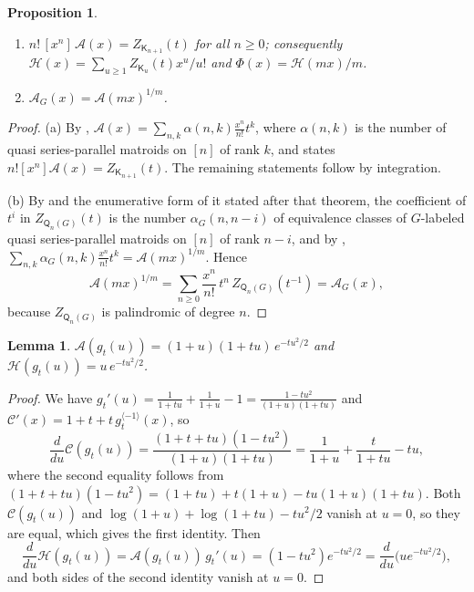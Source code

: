 \documentclass[11pt]{amsart}
\newtheorem{proposition}[theorem]{Proposition}
\newtheorem{lemma}[theorem]{Lemma}
\theoremstyle{definition}
\theoremstyle{remark}
\numberwithin{equation}{section}
\newcommand{\Q}{\mathsf{Q}}
\newcommand{\K}{\mathsf{K}}
\begin{document}
\begin{proposition}\label{prop:FL}
\begin{enumerate}[label=\textup{(\alph*)}]
\item $n!\,[x^n]\,\mathcal{A}(x)=Z_{\K_{n+1}}(t)$ for all $n\ge0$; consequently $\mathcal{H}(x)=\sum_{u\ge1}Z_{\K_u}(t)x^u/u!$ and $\Phi(x)=\mathcal{H}(mx)/m$.
\item $\mathcal{A}_G(x)=\mathcal{A}(mx)^{1/m}$.
\end{enumerate}
\end{proposition}

\begin{proof}
(a) By \cite[Propositions~2.3 and~2.8]{FL24}, $\mathcal{A}(x)=\sum_{n,k}\alpha(n,k)\frac{x^n}{n!}t^k$, where $\alpha(n,k)$ is the number of quasi series-parallel matroids on $[n]$ of rank $k$, and \cite[Corollary~3.2]{FL24} states $n![x^n]\mathcal{A}(x)=Z_{\K_{n+1}}(t)$. The remaining statements follow by integration.

(b) By \cite[Theorem~1.1]{FL26} and the enumerative form of it stated after that theorem, the coefficient of $t^i$ in $Z_{\Q_n(G)}(t)$ is the number $\alpha_G(n,n-i)$ of equivalence classes of $G$-labeled quasi series-parallel matroids on $[n]$ of rank $n-i$, and by \cite[Proposition~3.2]{FL26}, $\sum_{n,k}\alpha_G(n,k)\frac{x^n}{n!}t^k=\mathcal{A}(mx)^{1/m}$. Hence
\[
\mathcal{A}(mx)^{1/m}=\sum_{n\ge0}\frac{x^n}{n!}\,t^n\,Z_{\Q_n(G)}(t^{-1})=\mathcal{A}_G(x),
\]
because $Z_{\Q_n(G)}$ is palindromic of degree $n$.
\end{proof}

\begin{lemma}\label{lem:uncompose}
$\mathcal{A}(g_t(u))=(1+u)(1+tu)\,e^{-tu^2/2}$ and $\mathcal{H}(g_t(u))=u\,e^{-tu^2/2}$.
\end{lemma}

\begin{proof}
We have $g_t'(u)=\frac{1}{1+tu}+\frac{1}{1+u}-1=\frac{1-tu^2}{(1+u)(1+tu)}$ and $\mathcal{C}'(x)=1+t+t\,g_t^{\langle-1\rangle}(x)$, so
\[
\frac{d}{du}\mathcal{C}(g_t(u))=\frac{(1+t+tu)(1-tu^2)}{(1+u)(1+tu)}=\frac{1}{1+u}+\frac{t}{1+tu}-tu,
\]
where the second equality follows from $(1+t+tu)(1-tu^2)=(1+tu)+t(1+u)-tu(1+u)(1+tu)$. Both $\mathcal{C}(g_t(u))$ and $\log(1+u)+\log(1+tu)-tu^2/2$ vanish at $u=0$, so they are equal, which gives the first identity. Then
\[
\frac{d}{du}\mathcal{H}(g_t(u))=\mathcal{A}(g_t(u))\,g_t'(u)=(1-tu^2)e^{-tu^2/2}=\frac{d}{du}\bigl(ue^{-tu^2/2}\bigr),
\]
and both sides of the second identity vanish at $u=0$.
\end{proof}
\end{document}
